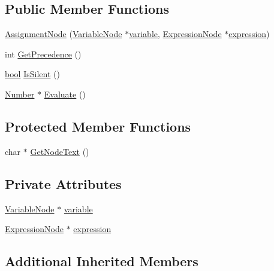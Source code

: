\subsection*{Public Member Functions}
\begin{DoxyCompactItemize}
\item 
\hyperlink{classAssignmentNode_a8b2b07073d9900677a8ffe93f7d4171d}{Assignment\+Node} (\hyperlink{classVariableNode}{Variable\+Node} $\ast$\hyperlink{classAssignmentNode_ac22933c48c43391f969b412158c729dc}{variable}, \hyperlink{classExpressionNode}{Expression\+Node} $\ast$\hyperlink{classAssignmentNode_a7a3400b79798f10506405c6a242deeaa}{expression})
\item 
int \hyperlink{classAssignmentNode_a8101830017b851c84364ca3ca6f0f204}{Get\+Precedence} ()
\item 
\hyperlink{platform_8h_a1062901a7428fdd9c7f180f5e01ea056}{bool} \hyperlink{classAssignmentNode_ad8468049bcb780828405ccddc06fc79a}{Is\+Silent} ()
\item 
\hyperlink{structNumber}{Number} $\ast$ \hyperlink{classAssignmentNode_ae6b454a04ec82aa97fa8e09c3752deb6}{Evaluate} ()
\end{DoxyCompactItemize}
\subsection*{Protected Member Functions}
\begin{DoxyCompactItemize}
\item 
char $\ast$ \hyperlink{classAssignmentNode_aabd296f88450781851cb521be3b647d4}{Get\+Node\+Text} ()
\end{DoxyCompactItemize}
\subsection*{Private Attributes}
\begin{DoxyCompactItemize}
\item 
\hyperlink{classVariableNode}{Variable\+Node} $\ast$ \hyperlink{classAssignmentNode_ac22933c48c43391f969b412158c729dc}{variable}
\item 
\hyperlink{classExpressionNode}{Expression\+Node} $\ast$ \hyperlink{classAssignmentNode_a7a3400b79798f10506405c6a242deeaa}{expression}
\end{DoxyCompactItemize}
\subsection*{Additional Inherited Members}


